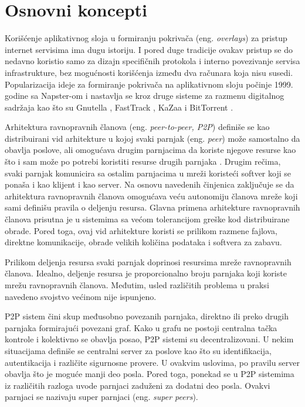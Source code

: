 \documentclass[12pt,oneside]{memoir}
\begin{document}
\section{Osnovni koncepti}
\label{P2P.1}
Korišćenje aplikativnog sloja u formiranju pokrivača (eng. \textit{overlays}) za pristup internet servisima ima dugu istoriju. I pored duge tradicije ovakav pristup se do nedavno koristio samo za dizajn specifičnih protokola i interno povezivanje servisa infrastrukture, bez mogućnosti korišćenja između dva računara koja nisu susedi. Popularizacija ideje za formiranje pokrivača na aplikativnom sloju počinje 1999. godine sa Napster-om \cite{Aberer_2004} i nastavlja se kroz druge sisteme za razmenu digitalnog sadržaja kao što su Gnutella \cite{Gnutella}, FastTrack \cite{FastTrack}, KaZaa \cite{kazaa} i BitTorrent \cite{Bittorent}. 

Arhitektura ravnopravnih članova (eng. \textit{peer-to-peer, P2P}) definiše se kao distribuirani vid arhitekture u kojoj svaki parnjak (eng. \textit{peer}) može samostalno da obavlja poslove, ali omogućava drugim parnjacima da koriste njegove resurse kao što i sam može po potrebi koristiti resurse drugih parnjaka \cite{Shen:2009}. Drugim rečima, svaki parnjak komunicira sa ostalim parnjacima u mreži koristeći softver koji se ponaša i kao klijent i kao server. Na osnovu navedenih činjenica zaključuje se da arhitektura ravnopravnih članova omogućava veću autonomiju članova mreže koji sami definišu pravila o deljenju resursa. Glavna primena arhitekture ravnopravnih članova prisutna je u sistemima sa većom tolerancijom greške kod distribuirane obrade. Pored toga, ovaj vid arhitekture koristi se prilikom razmene fajlova, direktne komunikacije, obrade velikih količina podataka i softvera za zabavu. 


Prilikom deljenja resursa svaki parnjak doprinosi resursima mreže ravnopravnih članova. Idealno, deljenje resursa je proporcionalno broju parnjaka koji koriste mrežu ravnopravnih članova. Međutim, usled različitih problema u praksi navedeno svojstvo većinom nije ispunjeno. 

P2P sistem čini skup međusobno povezanih parnjaka, direktno ili preko drugih parnjaka formirajući povezani graf. Kako u grafu ne postoji centralna tačka kontrole i kolektivno se obavlja posao, P2P sistemi su decentralizovani. U nekim situacijama definiše se centralni server za poslove kao što su identifikacija, autentikacija i različite sigurnosne provere. U ovakvim uslovima, po pravilu server obavlja što je moguće manji deo posla. Pored toga, ponekad se u P2P sistemima iz različitih razloga uvode parnjaci zaduženi za dodatni deo posla.
Ovakvi parnjaci se nazivaju super parnjaci (eng. \textit{super peers}).
\end{document}

